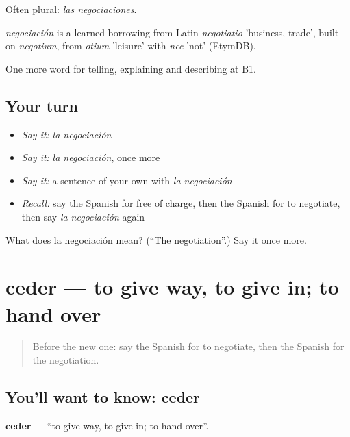 Often plural: \emph{las negociaciones}.

\begin{cousinweb}
\emph{negociación} is a learned borrowing from Latin \emph{negotiatio} 'business, trade', built on \emph{negotium}, from \emph{otium} 'leisure' with \emph{nec} 'not' (EtymDB).
\end{cousinweb}

\begin{grammarlens}[title={What you've built}]
One more word for telling, explaining and describing at B1.
\end{grammarlens}

\subsection*{Your turn}
\begin{itemize}
\raggedright
  \item \emph{Say it:} \emph{la negociación}
  \item \emph{Say it:} \emph{la negociación}, once more
  \item \emph{Say it:} a sentence of your own with \emph{la negociación}
  \item \emph{Recall:} say the Spanish for free of charge, then the Spanish for to negotiate, then say \emph{la negociación} again
\end{itemize}

\begin{tcolorbox}[breakable,colback=teal!4,colframe=teal!35!black,title={Before you move on}]
What does la negociación mean? (\textquotedblleft{}The negotiation\textquotedblright{}.) Say it once more.
\end{tcolorbox}
\section[ceder]{ceder — to give way, to give in; to hand over}

\label{lesson:ES-C634-ceder}



\begin{quote}
Before the new one: say the Spanish for to negotiate, then the Spanish for the negotiation.
\end{quote}

\subsection*{You'll want to know: ceder}
\textbf{ceder} — \textquotedblleft{}to give way, to give in; to hand over\textquotedblright{}.

